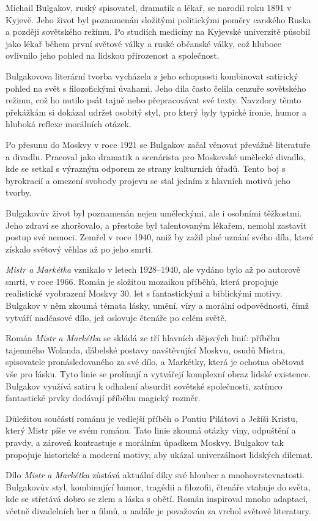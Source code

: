 \documentclass{article}
\begin{document}
Michail Bulgakov, ruský spisovatel, dramatik a lékař, se narodil roku 1891 v Kyjevě. Jeho život byl poznamenán složitými politickými poměry carského Ruska a později sovětského režimu. Po studiích medicíny na Kyjevské univerzitě působil jako lékař během první světové války a ruské občanské války, což hluboce ovlivnilo jeho pohled na lidskou přirozenost a společnost.
	
Bulgakovova literární tvorba vycházela z jeho schopnosti kombinovat satirický pohled na svět s filozofickými úvahami. Jeho díla často čelila cenzuře sovětského režimu, což ho nutilo psát tajně nebo přepracovávat své texty. Navzdory těmto překážkám si dokázal udržet osobitý styl, pro který byly typické ironie, humor a hluboká reflexe morálních otázek.
	
Po přesunu do Moskvy v roce 1921 se Bulgakov začal věnovat převážně literatuře a divadlu. Pracoval jako dramatik a scenárista pro Moskevské umělecké divadlo, kde se setkal s výrazným odporem ze strany kulturních úřadů. Tento boj s byrokracií a omezení svobody projevu se stal jedním z hlavních motivů jeho tvorby.
	
Bulgakovův život byl poznamenán nejen uměleckými, ale i osobními těžkostmi. Jeho zdraví se zhoršovalo, a přestože byl talentovaným lékařem, nemohl zastavit postup své nemoci. Zemřel v roce 1940, aniž by zažil plné uznání svého díla, které získalo světový věhlas až po jeho smrti.
	
\vspace{1em}
\noindent{}
\vspace{1em}
	
\textit{Mistr a Markétka} vznikalo v letech 1928–1940, ale vydáno bylo až po autorově smrti, v roce 1966. Román je složitou mozaikou příběhů, která propojuje realistické vyobrazení Moskvy 30. let s fantastickými a biblickými motivy. Bulgakov v něm zkoumá témata lásky, umění, víry a morální odpovědnosti, čímž vytváří nadčasové dílo, jež oslovuje čtenáře po celém světě.
	
Román \textit{Mistr a Markétka} se skládá ze tří hlavních dějových linií: příběhu tajemného Wolanda, ďábelské postavy navštěvující Moskvu, osudů Mistra, spisovatele pronásledovaného za své dílo, a Markétky, která je ochotna obětovat vše pro lásku. Tyto linie se prolínají a vytvářejí komplexní obraz lidské existence. Bulgakov využívá satiru k odhalení absurdit sovětské společnosti, zatímco fantastické prvky dodávají příběhu magický rozměr.
	
Důležitou součástí románu je vedlejší příběh o Pontiu Pilátovi a Ježíši Kristu, který Mistr píše ve svém románu. Tato linie zkoumá otázky viny, odpuštění a pravdy, a zároveň kontrastuje s morálním úpadkem Moskvy. Bulgakov tak propojuje historické a moderní motivy, aby ukázal univerzálnost lidských dilemat.
	
Dílo \textit{Mistr a Markétka} zůstává aktuální díky své hloubce a mnohovrstevnatosti. Bulgakovův styl, kombinující humor, tragédii a filozofii, čtenáře vtahuje do světa, kde se střetává dobro se zlem a láska s obětí. Román inspiroval mnoho adaptací, včetně divadelních her a filmů, a nadále je považován za vrchol světové literatury.
\end{document}
